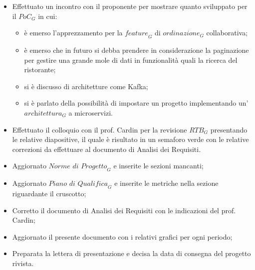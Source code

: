 \begin{itemize}
    \item Effettuato un incontro con il proponente per mostrare quanto sviluppato per il $\textit{PoC}_G$ in cui:
    \begin{itemize}
        \item è emerso l'apprezzamento per la $\textit{feature}_G$ di $\textit{ordinazione}_G$ collaborativa;
        \item è emerso che in futuro si debba prendere in considerazione la paginazione per gestire una grande mole di dati in funzionalità quali la ricerca del ristorante;
        \item si è discusso di architetture come Kafka;
        \item si è parlato della possibilità di impostare un progetto implementando un'$\textit{architettura}_G$ a microservizi.
    \end{itemize}
    \item Effettuato il colloquio con il prof. Cardin per la revisione $\textit{RTB}_G$ presentando le relative diapositive, il quale è risultato in un semaforo verde con le relative correzioni da effettuare al documento di Analisi dei Requisiti.
    \item Aggiornato $\textit{Norme di Progetto}_G$ e inserite le sezioni mancanti;
    \item Aggiornato $\textit{Piano di Qualifica}_G$ e inserite le metriche nella sezione riguardante il cruscotto;
    \item Corretto il documento di Analisi dei Requisiti con le indicazioni del prof. Cardin;
    \item Aggiornato il presente documento con i relativi grafici per ogni periodo;
    \item Preparata la lettera di presentazione e decisa la data di consegna del progetto rivista.
\end{itemize}
